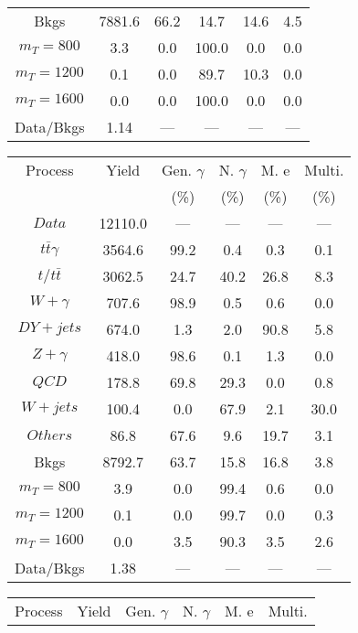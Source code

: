 \begin{figure}
\begin{minipage}[c]{0.32\textwidth}
{\begin{tabular}{cccccc}
Bkgs &  7881.6 &  66.2 &  14.7 &  14.6 &  4.5\\
$ m_{T} = 800 $ &  3.3 &  0.0 &  100.0 &  0.0 &  0.0\\
$ m_{T} = 1200 $ &  0.1 &  0.0 &  89.7 &  10.3 &  0.0\\
$ m_{T} = 1600 $ &  0.0 &  0.0 &  100.0 &  0.0 &  0.0\\
Data/Bkgs &  1.14 &  --- &  --- &  --- &  ---\\
\hline
\end{tabular}
}
\end{minipage}
\begin{minipage}[c]{0.32\textwidth}
\centering
\tiny{
\begin{tabular}{cccccc}
\hline
Process & Yield & Gen. $\gamma$ & N. $\gamma$ & M. e & Multi. \\
 &  & (\%) & (\%) & (\%) & (\%)  \\
\hline
                                                                      $ Data $ &  12110.0 &  --- &  --- &  --- &  ---\\
$ t\bar{t}\gamma $ &  3564.6 &  99.2 &  0.4 &  0.3 &  0.1\\
$ t/t\bar{t} $ &  3062.5 &  24.7 &  40.2 &  26.8 &  8.3\\
$ W+\gamma $ &  707.6 &  98.9 &  0.5 &  0.6 &  0.0\\
$ DY+jets $ &  674.0 &  1.3 &  2.0 &  90.8 &  5.8\\
$ Z+\gamma $ &  418.0 &  98.6 &  0.1 &  1.3 &  0.0\\
$ QCD $ &  178.8 &  69.8 &  29.3 &  0.0 &  0.8\\
$ W+jets $ &  100.4 &  0.0 &  67.9 &  2.1 &  30.0\\
$ Others $ &  86.8 &  67.6 &  9.6 &  19.7 &  3.1\\
Bkgs &  8792.7 &  63.7 &  15.8 &  16.8 &  3.8\\
$ m_{T} = 800 $ &  3.9 &  0.0 &  99.4 &  0.6 &  0.0\\
$ m_{T} = 1200 $ &  0.1 &  0.0 &  99.7 &  0.0 &  0.3\\
$ m_{T} = 1600 $ &  0.0 &  3.5 &  90.3 &  3.5 &  2.6\\
Data/Bkgs &  1.38 &  --- &  --- &  --- &  ---\\
\hline
\end{tabular}
}
\end{minipage}
\begin{minipage}[c]{0.32\textwidth}
\centering
\tiny{
\begin{tabular}{cccccc}
\hline
Process & Yield & Gen. $\gamma$ & N. $\gamma$ & M. e & Multi. \\

\end{tabular}}
\end{minipage}
\end{figure}
